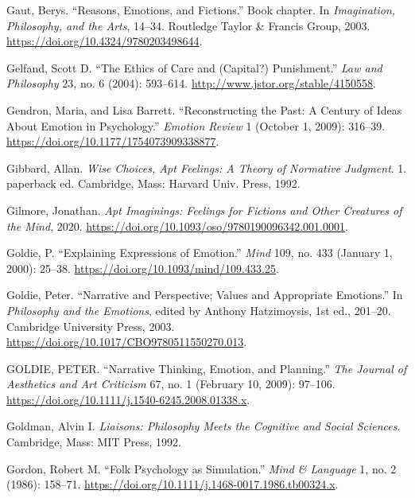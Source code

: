 \documentclass[phdthesis,12pt,final]{wuthesis}
\newlength{\cslhangindent}
\newenvironment{CSLReferences}[2] %
{\begin{list}{}{%
	\setlength{\itemindent}{0pt}
	\setlength{\leftmargin}{0pt}
	\setlength{\parsep}{0pt}
	\ifodd #1
	\setlength{\leftmargin}{\cslhangindent}
	\setlength{\itemindent}{-1\cslhangindent}
	\fi
	\setlength{\itemsep}{#2\baselineskip}}}
{\end{list}}
\theoremstyle{definition}
\theoremstyle{definition}
\theoremstyle{definition}
\theoremstyle{definition}
\theoremstyle{remark}
\begin{document}
\begin{CSLReferences}{1}{0}
Gaut, Berys. {``Reasons, Emotions, and Fictions.''} Book chapter. In \emph{Imagination, {Philosophy}, and the {Arts}}, 14--34. Routledge Taylor \& Francis Group, 2003. \url{https://doi.org/10.4324/9780203498644}.

Gelfand, Scott D. {``The {Ethics} of {Care} and ({Capital}?) {Punishment}.''} \emph{Law and Philosophy} 23, no. 6 (2004): 593--614. \url{http://www.jstor.org/stable/4150558}.

Gendron, Maria, and Lisa Barrett. {``Reconstructing the {Past}: {A Century} of {Ideas About Emotion} in {Psychology}.''} \emph{Emotion Review} 1 (October 1, 2009): 316--39. \url{https://doi.org/10.1177/1754073909338877}.

Gibbard, Allan. \emph{Wise Choices, Apt Feelings: A Theory of Normative Judgment}. 1. paperback ed. Cambridge, Mass: Harvard Univ. Press, 1992.

Gilmore, Jonathan. \emph{Apt {Imaginings}: {Feelings} for {Fictions} and {Other Creatures} of the {Mind}}, 2020. \url{https://doi.org/10.1093/oso/9780190096342.001.0001}.

Goldie, P. {``Explaining Expressions of Emotion.''} \emph{Mind} 109, no. 433 (January 1, 2000): 25--38. \url{https://doi.org/10.1093/mind/109.433.25}.

Goldie, Peter. {``Narrative and {Perspective}; {Values} and {Appropriate Emotions}.''} In \emph{Philosophy and the {Emotions}}, edited by Anthony Hatzimoysis, 1st ed., 201--20. Cambridge University Press, 2003. \url{https://doi.org/10.1017/CBO9780511550270.013}.

GOLDIE, PETER. {``Narrative {Thinking}, {Emotion}, and {Planning}.''} \emph{The Journal of Aesthetics and Art Criticism} 67, no. 1 (February 10, 2009): 97--106. \url{https://doi.org/10.1111/j.1540-6245.2008.01338.x}.

Goldman, Alvin I. \emph{Liaisons: Philosophy Meets the Cognitive and Social Sciences}. Cambridge, Mass: MIT Press, 1992.

Gordon, Robert M. {``Folk Psychology as Simulation.''} \emph{Mind \& Language} 1, no. 2 (1986): 158--71. \url{https://doi.org/10.1111/j.1468-0017.1986.tb00324.x}.


\end{CSLReferences}
\end{document}
